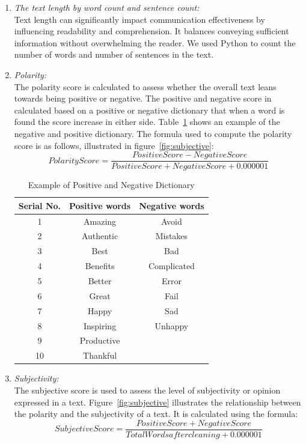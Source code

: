\begin{enumerate}
\item \textit{The text length by word count and sentence count:}\\
Text length can significantly impact communication effectiveness by influencing readability and comprehension. It balances conveying sufficient information without overwhelming the reader. We used Python to count the number of words and number of sentences in the text.

\item \textit{Polarity:}\\
The polarity score is calculated to assess whether the overall text leans towards being positive or negative.
The positive and negative score in calculated based on a positive or negative dictionary that when a word is found the score increase in either side. Table~\ref{tab:negativePositive} shows an example of the negative and positive dictionary. The formula used to compute the polarity score is as follows, illustrated in figure~\ref{fig:subjective}: 
\[ Polarity Score = \frac{Positive Score - Negative Score}{Positive Score + Negative Score + 0.000001} \]

\begin{table}[H]
\centering
\caption{Example of Positive and Negative Dictionary\cite{Mining2017Media}}
\label{tab:negativePositive}
\begin{tabular}{ccc}
\hline
\textbf{Serial No.} &
  \textbf{Positive words} &
  \textbf{Negative words} \\ \hline
1 & Amazing & Avoid \\ \hline
2 & Authentic & Mistakes \\ \hline
3 & Best & Bad \\ \hline
4 & Benefits & Complicated \\ \hline
5 & Better & Error \\ \hline
6 & Great & Fail \\ \hline
7 & Happy & Sad \\ \hline
8 & Inspiring & Unhappy \\ \hline
9 & Productive \\ \hline
10 & Thankful
\end{tabular}
\end{table}

\item \textit{Subjectivity:}\\
The subjective score is used to assess the level of subjectivity or opinion expressed in a text. Figure~\ref{fig:subjective} illustrates the relationship between the polarity and the subjectivity of a text. It is calculated using the formula:
\[ Subjective Score = \frac{Positive Score + Negative Score}{Total Words after cleaning + 0.000001} \]


\end{enumerate}
